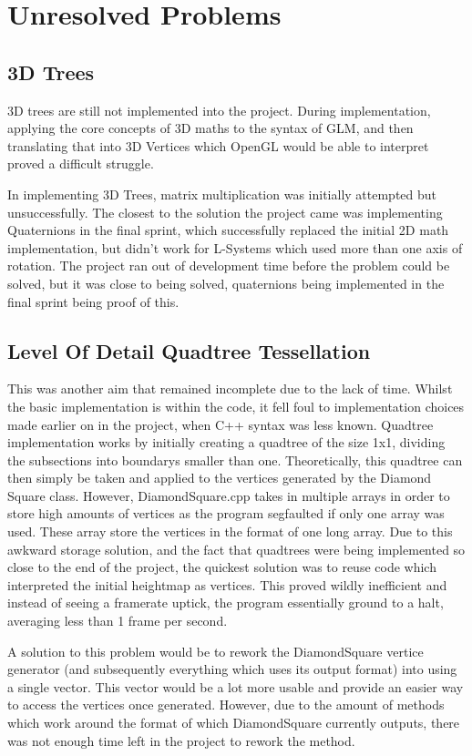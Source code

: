 \documentclass[a4paper,10pt]{report}
\begin{document}
\section{Unresolved Problems}
\subsection{3D Trees}
3D trees are still not implemented into the project. During implementation, applying the core concepts of 3D maths to the syntax of GLM, and then translating that into 3D Vertices which OpenGL would be able to interpret proved a difficult struggle. \medskip

In implementing 3D Trees, matrix multiplication was initially attempted but unsuccessfully. The closest to the solution the project came was implementing Quaternions in the final sprint, which successfully replaced the initial 2D math implementation, but didn't work for L-Systems which used more than one axis of rotation. The project ran out of development time before the problem could be solved, but it was close to being solved, quaternions being implemented in the final sprint being proof of this.

\subsection{Level Of Detail Quadtree Tessellation}
This was another aim that remained incomplete due to the lack of time. Whilst the basic implementation is within the code, it fell foul to implementation choices made earlier on in the project, when C++ syntax was less known. Quadtree implementation works by initially creating a quadtree of the size 1x1, dividing the subsections into boundarys smaller than one. Theoretically, this quadtree can then simply be taken and applied to the vertices generated by the Diamond Square class. However, DiamondSquare.cpp takes in multiple arrays in order to store high amounts of vertices as the program segfaulted if only one array was used. These array store the vertices in the format of one long array. Due to this awkward storage solution, and the fact that quadtrees were being implemented so close to the end of the project, the quickest solution was to reuse code which interpreted the initial heightmap as vertices. This proved wildly inefficient and instead of seeing a framerate uptick, the program essentially ground to a halt, averaging less than 1 frame per second. \medskip

A solution to this problem would be to rework the DiamondSquare vertice generator (and subsequently everything which uses its output format) into using a single vector. This vector would be a lot more usable and provide an easier way to access the vertices once generated. However, due to the amount of methods which work around the format of which DiamondSquare currently outputs, there was not enough time left in the project to rework the method. \medskip
\end{document}
